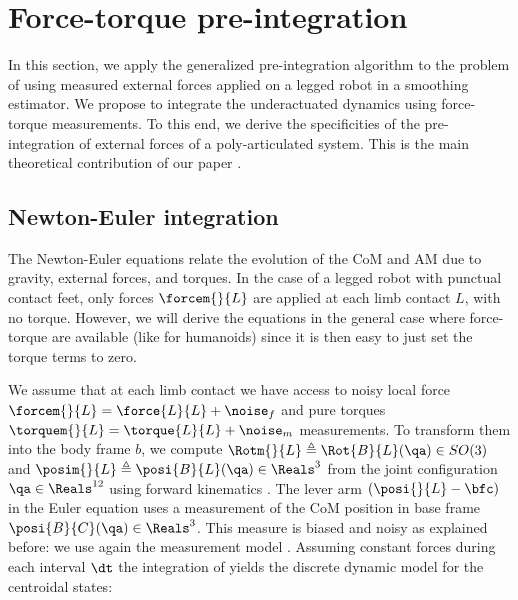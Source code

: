 \section{Force-torque pre-integration}
\label{sec:force_torque_preint}
In this section, we apply the generalized pre-integration algorithm to the problem of using measured external
forces applied on a legged robot in a smoothing estimator. We propose to integrate the underactuated dynamics  using force-torque measurements.
To this end, we derive the specificities of the pre-integration of external forces of a poly-articulated system. This is the main theoretical contribution
of our paper \cite{fourmy2021contact}.

\subsection{Newton-Euler integration}
The Newton-Euler equations  relate the evolution of the CoM and AM due to gravity, external forces, and torques. 
In the case of a legged robot with punctual contact feet, only forces $\forcem{}{L}$ are applied at each limb contact $L$, with no torque. 
However, we will derive the equations in the general case where force-torque are available (like for humanoids) since it is then easy to just set the 
torque terms to zero.

We assume that at each limb contact we have access to noisy local force $\forcem{}{L} = \force{L}{L} + \noise_f$ and pure torques 
$\torquem{}{L} = \torque{L}{L} + \noise_m$ measurements. 
To transform them into the body frame $b$, we compute $\Rotm{}{L} \triangleq \Rot{B}{L}(\qa)  \in SO(3)$ and $\posim{}{L} \triangleq \posi{B}{L}(\qa) \in \Reals^3 $ 
from the joint configuration $\qa  \in \Reals^{12}$ using forward kinematics . 
The lever arm $(\posi{}{L} - \bfc)$ in the Euler equation  uses a measurement of the CoM position in base frame $ \posi{B}{C}(\qa) \in \Reals^3$. 
This measure is biased and noisy as explained before: we use again the measurement model .
Assuming constant forces during each interval $\dt$ the integration of  yields the discrete dynamic model for the centroidal states:


